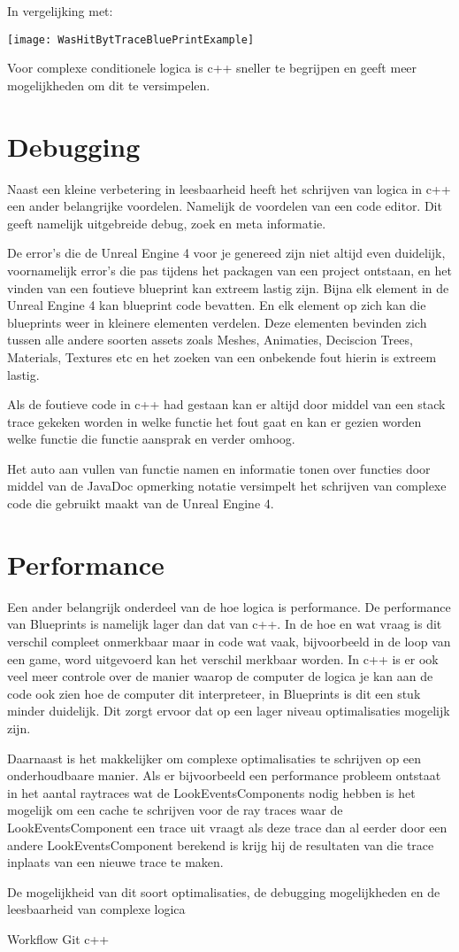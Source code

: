In vergelijking met:

\texttt{[image: WasHitBytTraceBluePrintExample]}

Voor complexe conditionele logica is c++ sneller te begrijpen en geeft meer mogelijkheden om dit te versimpelen. 

\section{Debugging}
Naast een kleine verbetering in leesbaarheid heeft het schrijven van logica in c++ een ander belangrijke voordelen. Namelijk de voordelen van een code editor. Dit geeft namelijk uitgebreide debug, zoek en meta informatie. 

De error’s die de Unreal Engine 4 voor je genereed zijn niet altijd even duidelijk, voornamelijk error’s die pas tijdens het packagen van een project ontstaan, en het vinden van een foutieve blueprint kan extreem lastig zijn. Bijna elk element in de Unreal Engine 4 kan blueprint code bevatten. En elk element op zich kan die blueprints weer in kleinere elementen verdelen. Deze elementen bevinden zich tussen alle andere soorten assets zoals Meshes, Animaties, Deciscion Trees, Materials, Textures etc en het zoeken van een onbekende fout hierin is extreem lastig.

Als de foutieve code in c++ had gestaan kan er altijd door middel van een stack trace gekeken worden in welke functie het fout gaat en kan er gezien worden welke functie die functie aansprak en verder omhoog. 

Het auto aan vullen van functie namen en informatie tonen over functies door middel van de JavaDoc opmerking notatie versimpelt het schrijven van complexe code die gebruikt maakt van de Unreal Engine 4. 

\section{Performance}
Een ander belangrijk onderdeel van de hoe logica is performance. De performance van Blueprints is namelijk lager dan dat van c++. In de hoe en wat vraag is dit verschil compleet onmerkbaar maar in code wat vaak, bijvoorbeeld in de loop van een game, word uitgevoerd kan het verschil merkbaar worden.
In c++ is er ook veel meer controle over de manier waarop de computer de logica je kan aan de code ook zien hoe de computer dit interpreteer, in Blueprints is dit een stuk minder duidelijk. Dit zorgt ervoor dat op een lager niveau optimalisaties mogelijk zijn. 

Daarnaast is het makkelijker om complexe optimalisaties te schrijven op een onderhoudbaare manier. Als er bijvoorbeeld een performance probleem ontstaat in het aantal raytraces wat de LookEventsComponents nodig hebben is het mogelijk om een cache te schrijven voor de ray traces waar de LookEventsComponent een trace uit vraagt als deze trace dan al eerder door een andere LookEventsComponent berekend is krijg hij de resultaten van die trace inplaats van een nieuwe trace te maken.

De mogelijkheid van dit soort optimalisaties, de debugging mogelijkheden en de leesbaarheid van complexe logica 

Workflow
Git
c++